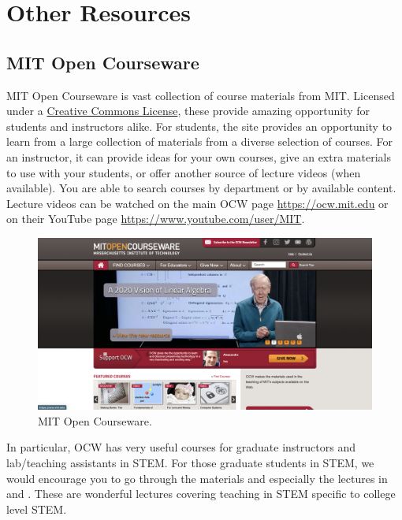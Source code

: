 \newpage
\section{Other Resources}

\subsection{MIT Open Courseware}

MIT Open Courseware is vast collection of course materials from MIT. Licensed under a \href{https://creativecommons.org/licenses/}{Creative Commons License}, these provide amazing opportunity for students and instructors alike. For students, the site provides an opportunity to learn from a large collection of materials from a diverse selection of courses. For an instructor, it can provide ideas for your own courses, give an extra materials to use with your students, or offer another source of lecture videos (when available). You are able to search courses by department or by available content. Lecture videos can be watched on the main OCW page \url{https://ocw.mit.edu} or on their YouTube page \url{https://www.youtube.com/user/MIT}. 

	\begin{figure}[!ht]
	\centering
	\includegraphics[width=\textwidth]{sections/other/images/ocw.png}
	\caption{MIT Open Courseware.}
	\end{figure}

In particular, OCW has very useful courses for graduate instructors and lab/teaching assistants in STEM. For those graduate students in STEM, we would encourage you to go through the materials and especially the lectures in  and . These are wonderful lectures covering teaching in STEM specific to college level STEM. 

